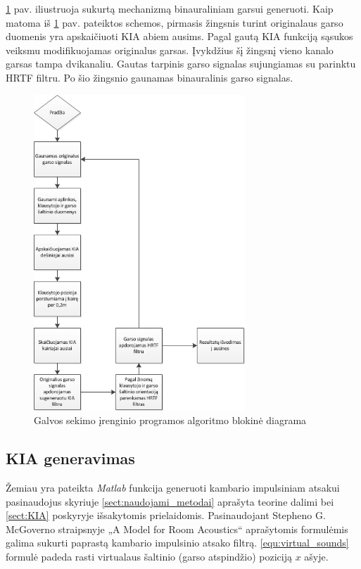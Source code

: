 \documentclass[]{vgtuef}
\begin{document}
{\ref{fig:binaural_schem} pav. iliustruoja sukurtą mechanizmą binauraliniam garsui generuoti. Kaip matoma iš \ref{fig:binaural_schem} pav. pateiktos schemos, pirmasis žingsnis turint originalaus garso duomenis yra apskaičiuoti KIA abiem ausims. Pagal gautą KIA funkciją sąsukos veiksmu modifikuojamas originalus garsas. Įvykdžius šį žingsnį vieno kanalo garsas tampa dvikanaliu. Gautas tarpinis garso signalas sujungiamas su parinktu HRTF filtru. Po šio žingsnio gaunamas binauralinis garso signalas.

\begin{figure}[!ht]
  \centering
  \includegraphics[width=300px]{img/binaural_schem.png}
  \caption{Galvos sekimo įrenginio programos algoritmo blokinė diagrama}
  \label{fig:binaural_schem}
\end{figure}

\subsection{KIA generavimas}

Žemiau yra pateikta \textit{Matlab} funkcija generuoti kambario impulsiniam atsakui pasinaudojus skyriuje \ref{sect:naudojami_metodai} aprašyta teorine dalimi bei \ref{sect:KIA} poskyryje išsakytomis prielaidomis.
Pasinaudojant Stepheno G. McGoverno straipsnyje „A Model for Room Acoustics“ aprašytomis formulėmis galima sukurti paprastą kambario impulsinio atsako filtrą.
\ref{equ:virtual_sounds} formulė padeda rasti virtualaus šaltinio (garso atspindžio) poziciją $x$ ašyje. 

}
\end{document}
